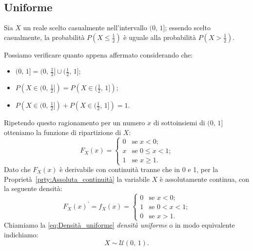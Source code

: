         \subsection{Uniforme}
            \begin{defn}\label{defn:Densità_uniforme}
                Sia $X$ un reale scelto casualmente nell'intervallo $(0,\,1]$; essendo scelto casualmente, la probabilità $P(X \leq \frac{1}{2})$ è uguale alla probabilità $P(X > \frac{1}{2})$.

                Possiamo verificare quanto appena affermato considerando che:
                \begin{itemize}
                    \item $(0,\,1] = (0,\,\frac{1}{2}] \cup (\frac{1}{2},\,1]$;
                    \item $P\left(X \in (0,\,\frac{1}{2}]\right) = P\left(X \in (\frac{1}{2},\,1]\right)$;
                    \item $P\left(X \in (0,\,\frac{1}{2}]\right) + P\left(X \in (\frac{1}{2},\,1]\right) = 1$.
                \end{itemize}
                Ripetendo questo ragionamento per un numero $x$ di sottoinsiemi di $(0,\,1]$ otteniamo la funzione di ripartizione di $X$: \[
                    F_X(x) = \begin{cases}
                        0 & \text{se $x < 0$;} \\
                        x & \text{se $0 \leq x < 1$;} \\
                        1 & \text{se $x \geq 1$.}
                    \end{cases}
                \] Dato che $F_X(x)$ è derivabile con continuità tranne che in 0 e 1, per la Proprietà~\ref{prty:Assoluta_continuità} la variabile $X$ è assolutamente continua, con la seguente densità:
                \begin{equation}\label{eq:Densità_uniforme} 
                    F_X(x)^{\prime} = f_X(x) = \begin{cases}
                        0 & \text{se $x < 0$;} \\
                        1 & \text{se $0 < x < 1$;} \\
                        0 & \text{se $x > 1$.}
                    \end{cases}
                \end{equation}
                Chiamiamo la \eqref{eq:Densità_uniforme} \textit{densità uniforme} o in modo equivalente indichiamo: \[
                    X \sim \mathcal{U}(0,\, 1)
                .\]
            \end{defn}
